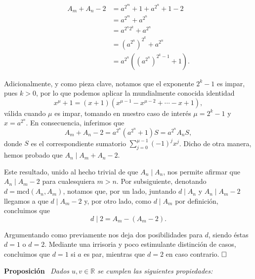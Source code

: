 \documentclass{article}
\newcommand{\mcd}{\text{mcd}}
\begin{document}
\begin{equation*}
    \begin{split}
        A_m + A_n - 2 &= a^{2^m} + 1 + a^{2^n} + 1 - 2 \\
        &= a^{2^m} + a^{2^n} \\
        &= a^{2^n2^k} + a^{2^n} \\
        &= \left(a^{2^n}\right)^{2^k} + a^{2^n} \\
        &= a^{2^n}\left(\left(a^{2^n}\right)^{2^k-1} + 1\right).
    \end{split}
\end{equation*}

Adicionalmente, y como pieza clave, notamos que el exponente $2^k - 1$ es impar, pues $k > 0$, por lo que podemos aplicar la mundialmente conocida identidad \[x^\mu + 1 = (x + 1)(x^{\mu-1} - x^{\mu-2} + \cdots - x + 1),\] válida cuando $\mu$ es impar, tomando en nuestro caso de interés $\mu = 2^k-1$ y $x = a^{2^n}$. En consecuencia, inferimos que \[A_m + A_n - 2 = a^{2^n}\left(a^{2^n} + 1\right)S = a^{2^n}A_nS,\] donde $S$ es el correspondiente sumatorio $\sum_{j=0}^{\mu-1} (-1)^jx^j$. Dicho de otra manera, hemos probado que $A_n \mid A_m + A_n - 2$.

Este resultado, unido al hecho trivial de que $A_n \mid A_n$, nos permite afirmar que $A_n \mid A_m - 2$ para cualesquiera $m > n$. Por subsiguiente, denotando $d = \mcd(A_n, A_m)$, notamos que, por un lado, juntando $d \mid A_n$ y $A_n \mid A_m - 2$ llegamos a que $d \mid A_m - 2$ y, por otro lado, como $d \mid A_m$ por definición, concluimos que \[d \mid 2 = A_m - (A_m - 2).\]

Argumentando como previamente nos deja dos posibilidades para $d$, siendo éstas $d = 1$ o $d = 2$. Mediante una irrisoria y poco estimulante distinción de casos, concluimos que $d = 1$ si $a$ es par, mientras que $d = 2$ en caso contrario. $\hfill\square$

\bigskip

\noindent\textbf{Proposición} \, \textit{Dados $u, v \in \mathbb{R}$ se cumplen las siguientes propiedades:}
\end{document}
